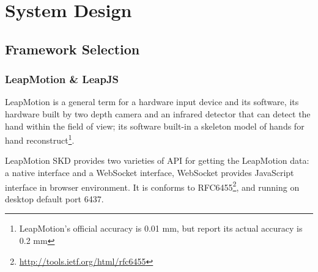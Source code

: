 \chapter{System Design}

\section{Framework Selection}

\subsection{LeapMotion \& LeapJS}


LeapMotion \cite{Leap:2016} is a general term for a hardware input device and its software, its hardware built by two depth camera and an infrared detector that can detect the hand within the field of view; its software built-in a skeleton model of hands for hand reconstruct\footnote{ LeapMotion's official accuracy is 0.01 mm, but \cite{weichert2013analysis, gdu2016} report its actual accuracy is 0.2 mm}.

LeapMotion SKD provides two varieties of API for getting the LeapMotion data: a native interface and a WebSocket interface, WebSocket provides JavaScript interface in browser environment. It is conforms to RFC6455\footnote{\url{http://tools.ietf.org/html/rfc6455}}, and running on desktop default port 6437.

